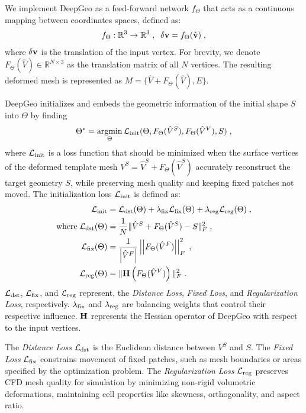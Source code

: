 We implement DeepGeo as a feed-forward network $f_{\Theta}$ that acts as a continuous mapping between coordinates spaces, defined as:
%
\begin{align}
    f_{\Theta} : \mathbb{R}^3 \rightarrow \mathbb{R}^3 \; , \;\;   \delta \mathbf{v} = f_{\Theta}(\hat{\mathbf{v}})     \; ,  \label{ch5:eq:map_dmm} 
\end{align}
%
where $\delta \mathbf{v}$ is the translation of the input vertex. For brevity, we denote $F_{\Theta}(\hat{V}) \in \mathbb{R}^{N\times3}$ as the translation matrix of all $N$ vertices. The resulting deformed mesh is represented as $M=\{\hat{V}+F_{\Theta}(\hat{V}), E\}$.

DeepGeo initializes and embeds the geometric information of the initial shape $S$ into $\Theta$ by finding
%
\begin{equation}
    \Theta^* = \argmin_{\Theta} \cL_{\rm init}(\Theta, F_\Theta(\hat{V}^S), F_\Theta(\hat{V}^V), S) \; , \label{ch5:eq:weightInit}
\end{equation}
%
where $\mathcal{L}_{\rm {init}}$ is a loss function that should be minimized when the surface vertices of the deformed template mesh $V^S=\hat{V}^S + F_{\Theta}(\hat{V}^S)$ accurately reconstruct the target geometry $S$, while preserving mesh quality and keeping fixed patches not moved.
The initialization loss $\mathcal{L}_{\rm {init}}$ is defined as:
%
\begin{align}
    \mathcal{L}_{\rm init}  &  =  \mathcal{L}_{\rm dst}(\Theta)  + \lambda_{\rm fix} \mathcal{L}_{\rm fix}(\Theta) +   \lambda_{\rm reg} \mathcal{L}_{\rm reg}(\Theta) \; , \label{ch5:eq:losses} \\
    \text{where}\; \mathcal{L}_{\rm dst}(\Theta)  & = \frac{1}{N} \| \hat{V}^S + F_\Theta(\hat{V}^S) - S \|^2_F\; ,  \nonumber  \\
    \mathcal{L}_{\rm fix} (\Theta)    & = \frac{1}{\left|\hat{V}^F\right|} \left|\left| F_\Theta(\hat{V}^F) \right|\right|^2_F \; ,  \nonumber   \\
    \mathcal{L}_{\rm reg} (\Theta)  & = \| \mathbf{H} \left( F_{\Theta}(\hat{V}^V) \right) \|^2_F\;.  \nonumber 
    \label{ch5:eq:weight_init_expanded}
\end{align}
%
$\mathcal{L}_{\rm dst}$, $\mathcal{L}_{\rm fix}$, and $\mathcal{L}_{\rm reg}$ represent, the {\it Distance Loss}, {\it Fixed Loss}, and {\it Regularization Loss}, respectively. $\lambda_{\rm fix}$  and $\lambda_{\rm reg}$ are balancing weights that control their respective influence. $\mathbf{H}$ represents the Hessian operator of DeepGeo with respect to the input vertices. 

The {\it Distance Loss}  $\mathcal{L}_{\rm dst}$ is the Euclidean distance between $V^S$ and $S$. The {\it Fixed Loss} $\mathcal{L}_{\rm fix}$ constrains movement of fixed patches, such as mesh boundaries or areas specified by the optimization problem. The {\it Regularization Loss} $\mathcal{L}_{\rm reg}$ preserves CFD mesh quality for simulation by minimizing non-rigid volumetric deformations, maintaining cell properties like skewness, orthogonality, and aspect ratio.

